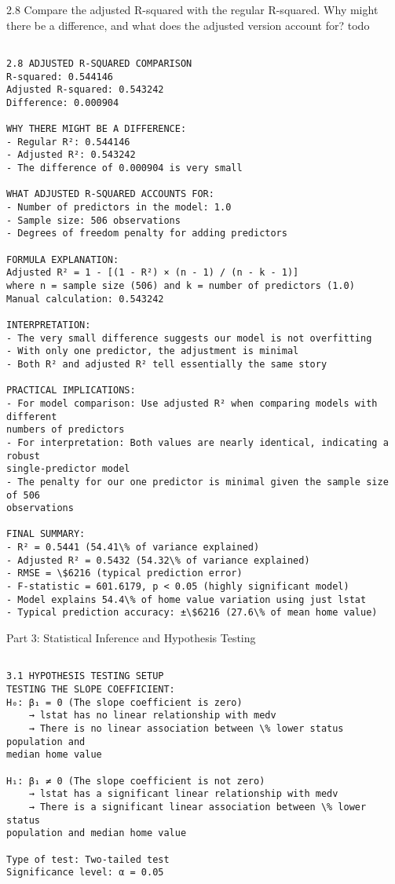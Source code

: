 \documentclass[11pt, twocolumn]{article}
\begin{document}
    2.8 Compare the adjusted R-squared with the regular R-squared. Why might
there be a difference, and what does the adjusted version account for?
todo

    \begin{Verbatim}[commandchars=\\\{\}]

2.8 ADJUSTED R-SQUARED COMPARISON
R-squared: 0.544146
Adjusted R-squared: 0.543242
Difference: 0.000904

WHY THERE MIGHT BE A DIFFERENCE:
- Regular R²: 0.544146
- Adjusted R²: 0.543242
- The difference of 0.000904 is very small

WHAT ADJUSTED R-SQUARED ACCOUNTS FOR:
- Number of predictors in the model: 1.0
- Sample size: 506 observations
- Degrees of freedom penalty for adding predictors

FORMULA EXPLANATION:
Adjusted R² = 1 - [(1 - R²) × (n - 1) / (n - k - 1)]
where n = sample size (506) and k = number of predictors (1.0)
Manual calculation: 0.543242

INTERPRETATION:
- The very small difference suggests our model is not overfitting
- With only one predictor, the adjustment is minimal
- Both R² and adjusted R² tell essentially the same story

PRACTICAL IMPLICATIONS:
- For model comparison: Use adjusted R² when comparing models with different
numbers of predictors
- For interpretation: Both values are nearly identical, indicating a robust
single-predictor model
- The penalty for our one predictor is minimal given the sample size of 506
observations

FINAL SUMMARY:
- R² = 0.5441 (54.41\% of variance explained)
- Adjusted R² = 0.5432 (54.32\% of variance explained)
- RMSE = \$6216 (typical prediction error)
- F-statistic = 601.6179, p < 0.05 (highly significant model)
- Model explains 54.4\% of home value variation using just lstat
- Typical prediction accuracy: ±\$6216 (27.6\% of mean home value)
    \end{Verbatim}

    Part 3: Statistical Inference and Hypothesis Testing

    \begin{Verbatim}[commandchars=\\\{\}]

3.1 HYPOTHESIS TESTING SETUP
TESTING THE SLOPE COEFFICIENT:
H₀: β₁ = 0 (The slope coefficient is zero)
    → lstat has no linear relationship with medv
    → There is no linear association between \% lower status population and
median home value

H₁: β₁ ≠ 0 (The slope coefficient is not zero)
    → lstat has a significant linear relationship with medv
    → There is a significant linear association between \% lower status
population and median home value

Type of test: Two-tailed test
Significance level: α = 0.05
    \end{Verbatim}
\end{document}
